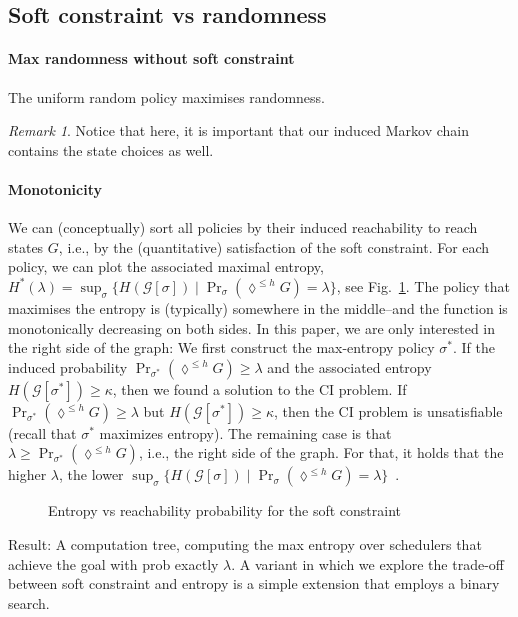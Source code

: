 \documentclass[conference]{IEEEtran}
\theoremstyle{remark}
\newtheorem{remark}{Remark}
\newcommand{\sg}{\mathcal{G}}
\newcommand{\eventually}[1]{\lozenge^{\leq #1}}
\newcommand{\sched}{\sigma}
\begin{document}
\subsection{Soft constraint vs randomness}
\paragraph{Max randomness without soft constraint}
The uniform random policy maximises randomness.
\begin{remark}
Notice that here, it is important that our induced Markov chain contains the state choices as well.	
\end{remark}


\paragraph{Monotonicity}
We can (conceptually) sort all policies by their induced reachability to reach states $G$, i.e., by the (quantitative) satisfaction of the soft constraint. For each policy, we can plot the associated maximal entropy, $H^*(\lambda) = \sup_{\sched} \{ H(\sg[\sched]) \mid \Pr_{\sched}(\eventually{h} G) = \lambda\}$, see Fig.~\ref{fig:entropyvspsat}.
The policy that maximises the entropy is (typically) somewhere in the middle--and the function is monotonically decreasing on both sides. 
In this paper, we are only interested in the right side of the graph:
We first construct the max-entropy policy $\sched^*$. If the induced probability $\Pr_{\sched^*}(\eventually{h} G) \geq \lambda$ and the associated entropy $H(\sg[\sched^*]) \geq \kappa$, then we found a solution to the CI problem. If $\Pr_{\sched^*}(\eventually{h} G) \geq \lambda$ but $H(\sg[\sched^*]) \geq \kappa$, then the CI problem is unsatisfiable (recall that $\sched^*$ maximizes entropy).
The remaining case is that $\lambda \geq \Pr_{\sched^*}(\eventually{h} G)$, i.e., the right side of the graph.
For that, it holds that the higher $\lambda$, the lower $\sup_{\sched} \{ H(\sg[\sched]) \mid \Pr_{\sched}(\eventually{h} G) = \lambda\}$~. 
\begin{figure}
\caption{Entropy vs reachability probability for the soft constraint}
\label{fig:entropyvspsat}
\end{figure}
Result: A computation tree, computing the max entropy over schedulers that achieve the goal with prob exactly $\lambda$.
A variant in which we explore the trade-off between soft constraint and entropy is a simple extension that employs a binary search.
\end{document}
